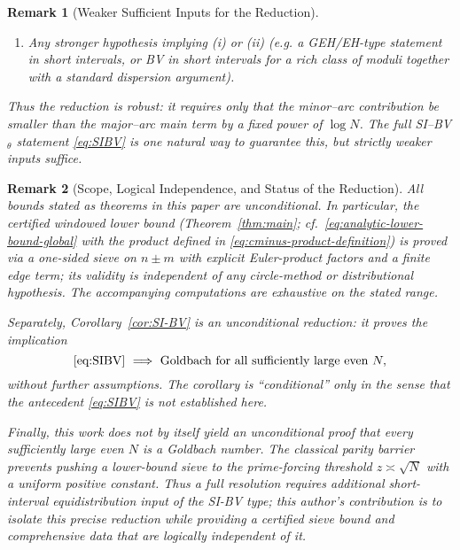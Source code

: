 \documentclass[11pt]{article}
\theoremstyle{inline}
\newtheorem*{remark}{Remark}
\theoremstyle{break}
\theoremstyle{break}
\theoremstyle{break}
\theoremstyle{break}
\theoremstyle{break}
\theoremstyle{break}
\theoremstyle{break}
\theoremstyle{inline}
\begin{document}
\begin{remark}[Weaker Sufficient Inputs for the Reduction]
\begin{enumerate}
\item[\textnormal{(iii)}] \emph{Any stronger hypothesis implying (i) or (ii)} (e.g. a GEH/EH-type statement in short intervals, or BV in short intervals for a rich class of moduli together with a standard dispersion argument).
\end{enumerate}

Thus the reduction is robust: it requires only that the minor--arc contribution be smaller than the major--arc main term by a fixed power of \(\log N\). The full SI--BV\(_\theta\) statement \eqref{eq:SIBV} is one natural way to guarantee this, but strictly weaker inputs suffice.
\end{remark}

\begin{remark}[Scope, Logical Independence, and Status of the Reduction]
\label{rem:scope-reduction}
All bounds stated as theorems in this paper are \emph{unconditional}. In particular, the certified windowed lower bound
(Theorem~\ref{thm:main}; cf.\ \eqref{eq:analytic-lower-bound-global} with the product defined in \eqref{eq:cminus-product-definition})
is proved via a one-sided sieve on \(n\pm m\) with explicit Euler-product factors and a finite edge term; its validity is
independent of any circle-method or distributional hypothesis. The accompanying computations are exhaustive on the stated range.

Separately, Corollary~\ref{cor:SI-BV} is an \emph{unconditional reduction}: it proves the implication
\begin{equation}
\text{\eqref{eq:SIBV}}\ \Longrightarrow\ \text{Goldbach for all sufficiently large even }N,
\end{equation}
without further assumptions. The corollary is “conditional” only in the sense that the antecedent \eqref{eq:SIBV} is not established here.

Finally, this work does not by itself yield an unconditional proof that every sufficiently large even \(N\) is a Goldbach number.
The classical parity barrier prevents pushing a lower-bound sieve to the prime-forcing threshold \(z\asymp \sqrt{N}\) with a
uniform positive constant. Thus a full resolution requires additional short-interval \emph{equidistribution} input of the
SI-BV type; this author's contribution is to isolate this precise reduction while providing a certified sieve bound and comprehensive data
that are logically independent of it.
\end{remark}
\end{document}

